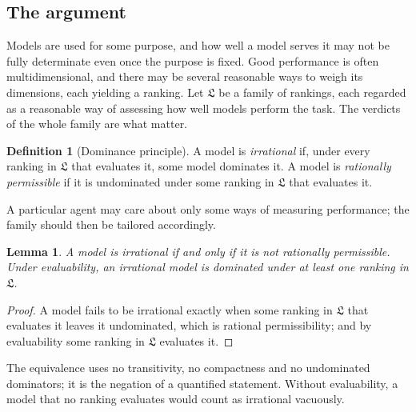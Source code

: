 \documentclass[11pt]{article}
\newtheorem{lemma}[theorem]{Lemma}
\theoremstyle{definition}
\newtheorem{definition}[theorem]{Definition}
\theoremstyle{remark}
\newcommand{\Lf}{\mathfrak L}
\begin{document}
\subsection{The argument}\label{sec:permissible}
Models are used for some purpose, and how well a model serves it may not be fully determinate even once the purpose is fixed. Good performance is often multidimensional, and there may be several reasonable ways to weigh its dimensions, each yielding a ranking. Let $\Lf$ be a family of rankings, each regarded as a reasonable way of assessing how well models perform the task. The verdicts of the whole family are what matter.

\begin{definition}[Dominance principle]\label{def:permissibility}
A model is \emph{irrational} if, under every ranking in $\Lf$ that evaluates it, some model dominates it. A model is \emph{rationally permissible} if it is undominated under some ranking in $\Lf$ that evaluates it.
\end{definition}

A particular agent may care about only some ways of measuring performance; the family should then be tailored accordingly.

\begin{lemma}\label{lem:complement}
A model is irrational if and only if it is not rationally permissible. Under evaluability, an irrational model is dominated under at least one ranking in $\Lf$.
\end{lemma}
\begin{proof}
A model fails to be irrational exactly when some ranking in $\Lf$ that evaluates it leaves it undominated, which is rational permissibility; and by evaluability some ranking in $\Lf$ evaluates it.
\end{proof}
The equivalence uses no transitivity, no compactness and no undominated dominators; it is the negation of a quantified statement. Without evaluability, a model that no ranking evaluates would count as irrational vacuously.
\end{document}
